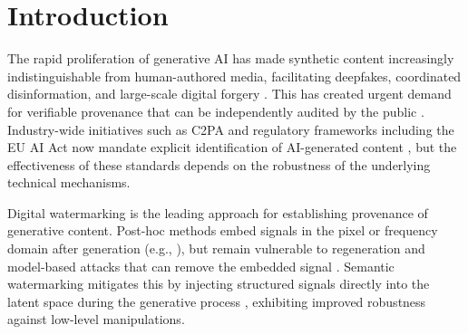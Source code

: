 \documentclass{article}
\theoremstyle{plain}
\theoremstyle{definition}
\theoremstyle{remark}
\begin{document}
\printAffiliationsAndNotice{}  %

\begin{abstract} 
Generative AI models now produce images indistinguishable from real data, making publicly verifiable provenance essential; however, existing watermarking methods become vulnerable to imprint forgeries and adversarial optimization attacks once their detectors are made public. We propose PP-Mark, a provenance framework that anchors lightweight statistical detection to a zero-knowledge proof of the embedding process, ensuring that forged content cannot pass full verification by construction. We establish formal unforgeability under standard cryptographic assumptions and validate PP-Mark against representative baselines across two architectures, demonstrating resistance to black-box imprint transfer, white-box optimization, and regeneration attacks while remaining practical for decentralized verification.
\end{abstract}


\section{Introduction}
The rapid proliferation of generative AI has made synthetic content increasingly indistinguishable from human-authored media, facilitating deepfakes, coordinated disinformation, and large-scale digital forgery \cite{chesney_citron2019}. This has created urgent demand for verifiable provenance that can be independently audited by the public \cite{longpre2024dataauth}. Industry-wide initiatives such as C2PA and regulatory frameworks including the EU AI Act now mandate explicit identification of AI-generated content \cite{c2pa_spec_2_3}, but the effectiveness of these standards depends on the robustness of the underlying technical mechanisms.

Digital watermarking is the leading approach for establishing provenance of generative content. Post-hoc methods embed signals in the pixel or frequency domain after generation (e.g., \cite{zhu2018hidden}), but remain vulnerable to regeneration and model-based attacks that can remove the embedded signal \cite{zhao2024removable}. Semantic watermarking mitigates this by injecting structured signals directly into the latent space during the generative process \cite{wen2023treerings,fernandez2023stablesignature,zhang2024zodiac}, exhibiting improved robustness against low-level manipulations.
\end{document}
